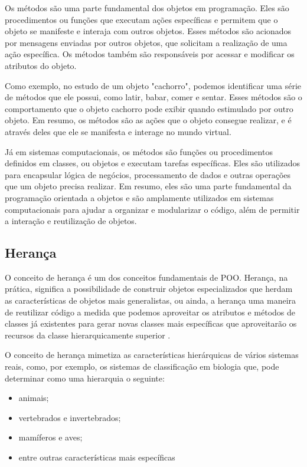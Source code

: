 Os métodos são uma parte fundamental dos objetos em programação. Eles são procedimentos ou funções que executam ações específicas e permitem que o objeto se manifeste e interaja com outros objetos. Esses métodos são acionados por mensagens enviadas por outros objetos, que solicitam a realização de uma ação específica. Os métodos também são responsáveis por acessar e modificar os atributos do objeto.

Como exemplo, no estudo de um objeto "cachorro", podemos identificar uma série de métodos que ele possui, como latir, babar, comer e sentar. Esses métodos são o comportamento que o objeto cachorro pode exibir quando estimulado por outro objeto. Em resumo, os métodos são as ações que o objeto consegue realizar, e é através deles que ele se manifesta e interage no mundo virtual.

Já em sistemas computacionais, os métodos são funções ou procedimentos definidos em classes, ou objetos e executam tarefas específicas. Eles são utilizados para encapsular lógica de negócios, processamento de dados e outras operações que um objeto precisa realizar. Em resumo, eles são uma parte fundamental da programação orientada a objetos e são amplamente utilizados em sistemas computacionais para ajudar a organizar e modularizar o código, além de permitir a interação e reutilização de objetos.

\subsection{Herança}\label{subsection:heranca}

O conceito de herança é um dos conceitos fundamentais de POO. Herança, na prática, significa a possibilidade de construir objetos especializados que herdam as características de objetos mais generalistas, ou ainda, a herança uma maneira de reutilizar código a medida que podemos aproveitar os atributos e métodos de classes já existentes para gerar novas classes mais específicas que aproveitarão os recursos da classe hierarquicamente superior \cite{evandroeduardoseronruiz2008}.

O conceito de herança mimetiza as características hierárquicas de vários sistemas reais, como, por exemplo, os sistemas de classificação em biologia que, pode determinar como uma hierarquia o seguinte:

\begin{itemize}
    \item animais;
    \item vertebrados e invertebrados;
    \item mamíferos e aves;
    \item entre outras características mais específicas
\end{itemize}

